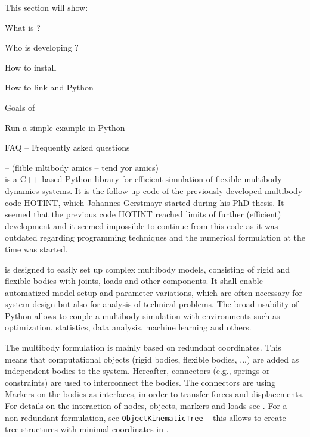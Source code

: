 This section will show:
\bn
  \item What is \codeName ?
  \item Who is developing \codeName ?
  \item How to install \codeName 
  \item How to link \codeName and Python
  \item Goals of \codeName
  \item Run a simple example in Python
  \item FAQ -- Frequently asked questions
\en

\codeName -- {\small (flible mltibody amics  -- tend yor amics)}\vspace{6pt}\\
\noindent \codeName is a C++ based Python library for efficient simulation of flexible multibody dynamics systems.
It is the follow up code of the previously developed multibody code HOTINT, which Johannes Gerstmayr started during his PhD-thesis.
It seemed that the previous code HOTINT reached limits of further (efficient) development and it seemed impossible to continue from this code as it was outdated regarding programming techniques and the numerical formulation at the time \codeName was started.

\codeName is designed to easily set up complex multibody models, consisting of rigid and flexible bodies with joints, loads and other components. It shall enable automatized model setup and parameter variations, which are often necessary for system design but also for analysis of technical problems. The broad usability of Python allows to couple a multibody simulation with environments such as optimization, statistics, data analysis, machine learning and others.

The multibody formulation is mainly based on redundant coordinates. This means that computational objects (rigid bodies, flexible bodies, ...) are added as independent bodies to the system. Hereafter, connectors (e.g., springs or constraints) are used to interconnect the bodies. The connectors are using Markers on the bodies as interfaces, in order to transfer forces and displacements.
For details on the interaction of nodes, objects, markers and loads see . For a non-redundant formulation, see \texttt{ObjectKinematicTree} -- this allows to create tree-structures with minimal coordinates in \codeName.

